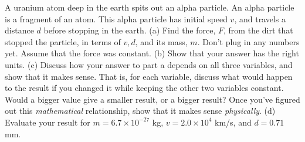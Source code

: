  A uranium atom deep in the earth spits out an alpha
particle. An alpha particle is a fragment of an atom. This
alpha particle has initial speed $v$, and travels a distance
$d$ before stopping in the earth.\hwendpart
 (a) Find the force, $F$, from the dirt
that stopped the particle, in terms of $v,d$, and its mass,
$m$. Don't plug in any numbers yet. Assume that the force
was constant.\answercheck\hwendpart
 (b) Show that your answer has the right units.\hwendpart
(c) Discuss how your answer to part a depends on all three
variables, and show that it makes sense. That is, for each
variable, discuss what would happen to the result if you
changed it while keeping the other two variables constant.
Would a bigger value give a smaller result, or a bigger
result? Once you've figured out this \emph{mathematical}
relationship, show that it makes sense \emph{physically}.\hwendpart
(d) Evaluate your result for $m=6.7\times10^{-27}$  kg,
$v=2.0\times10^4$  km/s, and $d=0.71$ mm.\answercheck\hwendpart

